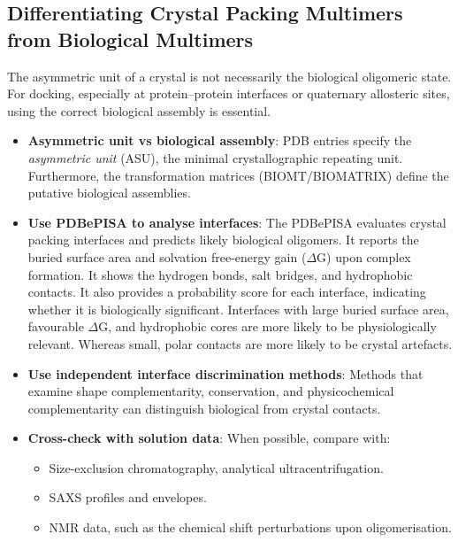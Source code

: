 \documentclass[12pt]{article}
\begin{document}
\subsection{Differentiating Crystal Packing Multimers from Biological Multimers}
The asymmetric unit of a crystal is not necessarily the biological oligomeric state. For docking, especially at protein--protein interfaces or quaternary allosteric sites, using the correct biological assembly is essential.

\begin{itemize}
\item \textbf{Asymmetric unit vs biological assembly}: PDB entries specify the \emph{asymmetric unit} (ASU), the minimal crystallographic repeating unit. Furthermore, the transformation matrices (BIOMT/BIOMATRIX) define the putative biological assemblies.

\item \textbf{Use PDBePISA to analyse interfaces}: The PDBePISA\cite{CH4_Krissinel2007_PISA} evaluates crystal packing interfaces and predicts likely biological oligomers. It reports the buried surface area and solvation free-energy gain ($\Delta \textrm{G}$) upon complex formation. It shows the hydrogen bonds, salt bridges, and hydrophobic contacts. It also provides a probability score for each interface, indicating whether it is biologically significant. Interfaces with large buried surface area, favourable $\Delta \textrm{G}$, and hydrophobic cores are more likely to be physiologically relevant. Whereas small, polar contacts are more likely to be crystal artefacts.

\item \textbf{Use independent interface discrimination methods}: Methods that examine shape complementarity, conservation, and physicochemical complementarity can distinguish biological from crystal contacts.

\item \textbf{Cross-check with solution data}: When possible, compare with:
\begin{itemize}
  \item Size-exclusion chromatography, analytical ultracentrifugation.
  \item SAXS\cite{CH4_Valentini2015_SASBDB,CH4_pesce2021refining} profiles and envelopes.
  \item NMR data\cite{CH4_Ulrich2008_BMRB}, such as the chemical shift perturbations upon oligomerisation.
\end{itemize}


\end{itemize}
\end{document}
